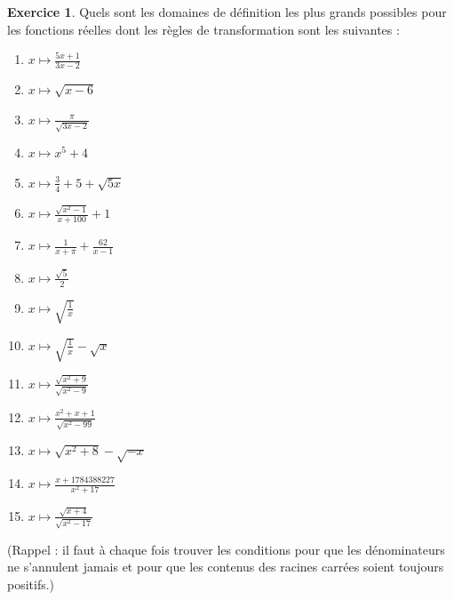 \documentclass[a4paper,13pt]{scrreprt}
\theoremstyle{plain}
\theoremstyle{definition}
\newtheorem{exo}[subsection]{Exercice}
\begin{document}
\begin{exo} \label{exof4}
	Quels sont les domaines de définition les plus grands possibles pour les fonctions réelles dont les règles de transformation sont les suivantes :
	\begin{enumerate}
		\item $x \mapsto \frac{5x+1}{3x-2}$ \\
		\item $x \mapsto \sqrt{x-6}$ \\
		\item $x \mapsto \frac{\pi}{\sqrt{3x-2}}$ \\
		\item $x \mapsto x^5 +4$ \\
		\item $x \mapsto \frac{3}{4} + 5 + \sqrt{5x}$ \\
		\item $x \mapsto \frac{\sqrt{x^2 - 1}}{x+100} + 1$ \\
		\item $x \mapsto \frac{1}{x+\pi} + \frac{62}{x-1}$ \\
		\item $x \mapsto \frac{\sqrt{5}}{2}$ \\
		\item $x \mapsto \sqrt{\frac{1}{x}}$ \\
		\item $x \mapsto \sqrt{\frac{1}{x}} - \sqrt{x}$ \\
		\item $x \mapsto \frac{\sqrt{x^2+9}}{\sqrt{x^2-9}}$ \\
		\item $x \mapsto \frac{x^2+x+1}{\sqrt{x^2-99}}$ \\
		\item $x \mapsto \sqrt{x^2 +8} - \sqrt{-x}$ \\
		\item $x \mapsto \frac{x+1784388227}{x^2+17}$ \\
		\item $x \mapsto \frac{\sqrt{x+4}}{\sqrt{x^2-17}}$ \\
	\end{enumerate}
	(Rappel : il faut à chaque fois trouver les conditions pour que les dénominateurs ne s'annulent jamais et pour que les contenus des racines carrées soient toujours positifs.)
\end{exo}
\end{document}
